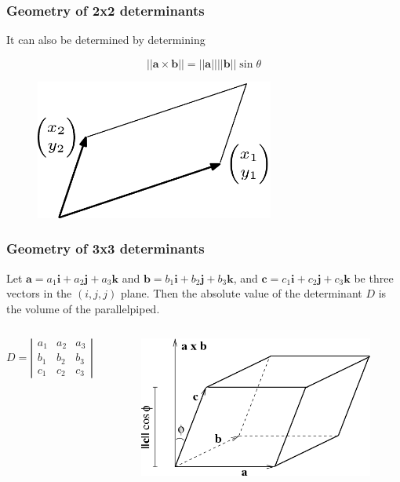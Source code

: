 \documentclass{beamer}
\begin{document}
\begin{frame}
\frametitle{Geometry of 2x2 determinants}
It can also be determined by determining 

$$|| \mathbf{a} \times \mathbf{b}|| = || \mathbf{a} || ||\mathbf{b}|| \sin{\theta}$$    
\begin{figure}[htbp]
\begin{center}
 \includegraphics[width=0.7\textwidth]{parallelogram.png}
\caption{}
\end{center}
\end{figure}
\end{frame}
\begin{frame}
\frametitle{Geometry of 3x3 determinants}
Let $\mathbf{a} = a_1 \mathbf{i} + a_2 \mathbf{j} + a_3 \mathbf{k}$  and $\mathbf{b} = b_1 \mathbf{i} + b_2 \mathbf{j} + b_3 \mathbf{k}$, and   $\mathbf{c} = c_1 \mathbf{i} + c_2 \mathbf{j} + c_3 \mathbf{k}$ be three vectors in the 
$(i,j,j)$ plane. Then the absolute value of the determinant $D$ is the volume of the parallelpiped.
\begin{columns}[c]

$$D =  
\left| \begin{array}{ccc}
a_1 & a_2 & a_3\\
b_1 & b_2 & b_3\\
c_1 & c_2 & c_3
\end{array}
\right|$$
\begin{figure}[htbp]
\begin{center}
 \includegraphics[width=\textwidth]{volume_parallelepiped.png}
\caption{}
\end{center}
\end{figure}
\end{columns}
\end{frame}
\end{document}
